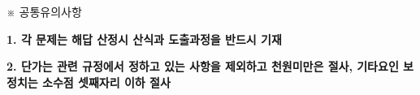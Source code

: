 ※ 공통유의사항 \par
\textbf{1. 각 문제는 해답 산정시 산식과 도출과정을 반드시 기재} \par
\textbf{2. 단가는 관련 규정에서 정하고 있는 사항을 제외하고 천원미만은 절사, 기타요인 보정치는 소수점 셋째자리 이하 절사} \par
